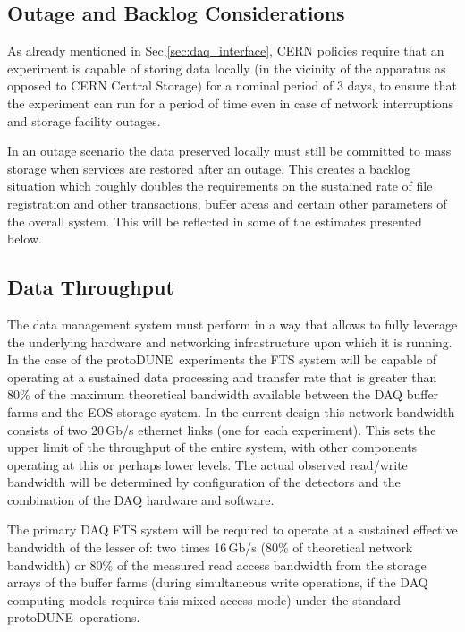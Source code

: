 \documentclass[pdftex,12pt,letter]{article}
\newcommand{\pd}{protoDUNE\ }
\begin{document}
\subsection{Outage and Backlog Considerations}
\label{sec:backlog}
As already mentioned in Sec.\ref{sec:daq_interface},
CERN policies require that an experiment is capable of storing data locally (in the vicinity of the apparatus as opposed to CERN Central
Storage)  for a nominal period of 3 days, to ensure that the experiment can run for a period of time even in case of network interruptions
and storage facility outages.

In an outage scenario the data preserved locally must still be committed to mass storage when services are
restored after an outage. This creates a backlog situation which roughly doubles the requirements on the sustained
rate of file registration and other transactions, buffer areas and certain other parameters of the overall system.
This will be reflected in some of the estimates presented below.


\subsection{Data Throughput}

The data management system must perform in a way that allows to fully leverage the underlying hardware and networking infrastructure
upon which  it is running.  In the case of the \pd experiments the FTS system will be capable of operating at a sustained data processing and transfer
rate that is greater than 80\% of the maximum theoretical bandwidth available between the DAQ buffer farms and the EOS storage system.
In the current design this network bandwidth consists of two 20\,Gb/s ethernet links (one for each experiment).
This sets the upper limit of the throughput of the entire system, with other components operating at this or perhaps lower levels.
The actual observed read/write bandwidth will be determined by configuration of the detectors and the combination
of the DAQ hardware and software.


  The primary DAQ FTS system will be required to operate at a sustained effective bandwidth
of the lesser of: two times 16\,Gb/s (80\% of theoretical network bandwidth) or 80\% of the measured read access bandwidth from the storage arrays
of the buffer farms
(during simultaneous write operations, if the DAQ computing models requires this mixed access mode) under the standard \pd operations.
\end{document}
